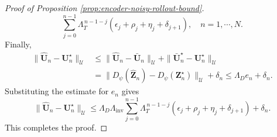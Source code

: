\documentclass[11pt]{article}
\begin{document}
\begin{proof}[Proof of Proposition \ref{prop:encoder-noisy-rollout-bound}]
\[\sum_{j=0}^{n-1}\Lambda_T^{\,n-1-j}
\left(\epsilon_j+\rho_j+\eta_j+\delta_{j+1}\right),\quad n=1,\cdots,N.
\]
Finally,
\[
\begin{aligned}
\|\widehat{\mathbf U}_n-\mathbf U^\star_n\|_{\mathcal U}
&\le\|\widehat{\mathbf U}_n-\bar{\mathbf U}_n\|_{\mathcal U}+\|\bar{\mathbf U}_n^\star-\mathbf U^\star_n\|_{\mathcal U} \\
&=\|D_\psi(\widehat{\mathbf Z}_n)-D_\psi(\mathbf Z_n^\star)\|_{\mathcal U}+\delta_n \le\Lambda_D e_n+\delta_n.
\end{aligned}
\]
Substituting the estimate for $e_n$ gives
\[
\|\widehat{\mathbf U}_n-\mathbf U^\star_n\|_{\mathcal U}\le\Lambda_D\Lambda_{\mathrm{inv}}\sum_{j=0}^{n-1}\Lambda_T^{\,n-1-j}\left(\epsilon_j+\rho_j+\eta_j+\delta_{j+1}
\right)+\delta_n.
\]
This completes the proof.
\end{proof}
\end{document}
